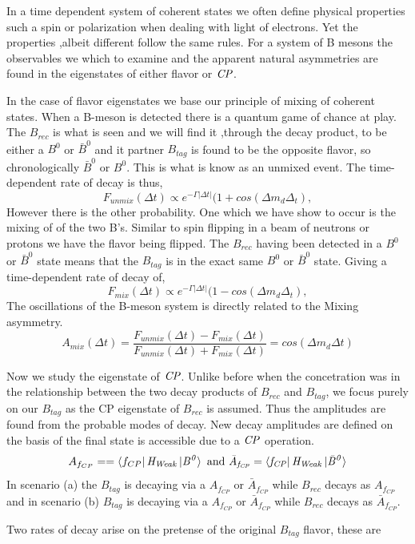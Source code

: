In a time dependent system of coherent states we often define physical properties such a spin or polarization when dealing with light of electrons. Yet the properties ,albeit different follow the same rules. For a system of B mesons the observables we which to examine and the apparent natural asymmetries are found in the eigenstates of either flavor or $\it{CP}$. 

In the case of flavor eigenstates we base our principle of mixing of coherent states. When a B-meson is detected there is a quantum game of chance at play. The $B_{rec}$ is what is seen and we will find it ,through the decay product, to be either a $B^0$ or $\bar{B}^0$ and it partner $B_{tag}$ is found to be the opposite flavor, so  chronologically $\bar{B}^0$ or $B^0$. This is what is know as an unmixed event. The time-dependent rate of decay is thus,
\[F_{unmix}(\Delta t) \propto e^{-\Gamma\left|\Delta t\right|}(1 + cos(\Delta m_d \Delta_t),\]
However there is the other probability. One which we have show to occur is the mixing of of the two B's. Similar to spin flipping in a beam of neutrons or protons we have the flavor being flipped. The $B_{rec}$ having been detected in a $B^0$ or $\bar{B}^0$ state means that the $B_{tag}$ is in the exact same $B^0$ or $\bar{B}^0$ state. Giving a time-dependent rate of decay of,
\[F_{mix}(\Delta t) \propto e^{-\Gamma\left|\Delta t\right|}(1 - cos(\Delta m_d \Delta_t),\]
The oscillations of the B-meson system is directly related to the Mixing asymmetry.
\[A_{mix}(\Delta t) = \frac{F_{unmix}(\Delta t)-F_{mix}(\Delta t)}{F_{unmix}(\Delta t)+F_{mix}(\Delta t)} = cos(\Delta m_d\Delta t) \]

Now we study the eigenstate of $\it{CP}$. Unlike before when the concetration was in the relationship between the two decay products of $B_{rec}$ and $B_{tag}$, we focus purely on our $B_{tag}$ as the CP eigenstate of $B_{rec}$ is assumed. Thus the amplitudes are found from the probable modes of decay. New decay amplitudes are defined on the basis of the final state is accessible due to a $\it{CP}$ operation.
\[A_{f_{CP}}==\bra{f_{CP}}\it{H_{Weak}}\ket{B^{0}} \mbox{ and } \bar{A}_{f_{CP}}=\bra{f_{CP}}\it{H_{Weak}}\ket{\bar{B}^{0}}\]
In scenario (a) the $B_{tag}$ is decaying via a $A_{f_{CP}}$ or $\bar{A}_{f_{CP}}$ while $B_{rec}$ decays as $A_{f_{CP}}$ and in scenario (b) $B_{tag}$ is decaying via a $A_{f_{CP}}$ or $\bar{A}_{f_{CP}}$ while $B_{rec}$ decays as $\bar{A}_{f_{CP}}$. 

Two rates of decay arise on the pretense of the original $B_{tag}$ flavor, these are

